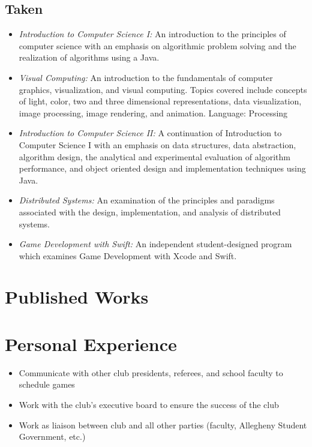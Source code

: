 \documentclass[11pt,a4paper,sans]{moderncv} %
\begin{document}
{{\subsection{Taken}
\begin{itemize}
\item {\textit{Introduction to Computer Science I: }{An introduction to the principles of computer science with an emphasis on algorithmic problem solving and the realization of algorithms using a Java.}}
\item{\textit{Visual Computing: }{An introduction to the fundamentals of computer graphics, visualization, and visual computing. Topics covered include concepts of light, color, two and three dimensional representations, data visualization, image processing, image rendering, and animation. Language: Processing}}
\item{\textit{Introduction to Computer Science II: }{A continuation of Introduction to Computer Science I with an emphasis on data structures, data abstraction, algorithm design, the analytical and experimental evaluation of algorithm performance, and object oriented design and implementation techniques using Java.}}
\item{\textit{Distributed Systems: }{An examination of the principles and paradigms associated with the design, implementation, and analysis of distributed systems.}}
\item{\textit{Game Development with Swift: }{ An independent student-designed program which examines Game Development with Xcode and Swift.}}
\end{itemize}


\section{Published Works}


\section{Personal Experience}
\begin{itemize}
\item{Communicate with other club presidents, referees, and school faculty to schedule games}
\item{Work with the club's executive board to ensure the success of the club}
\item{Work as liaison between club and all other parties (faculty, Allegheny Student Government, etc.) }
\end{itemize}

}}
\end{document}
